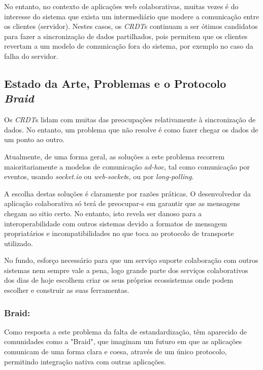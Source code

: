 \documentclass[runningheads]{llncs}
\begin{document}
        No entanto, no contexto de aplicações web colaborativas, muitas vezes é do 
        interesse do sistema que exista um intermediário que modere a comunicação entre 
        os clientes (servidor). Nestes casos, os {\itshape CRDT}s continuam a ser ótimos 
        candidatos para fazer a sincronização de dados partilhados, pois permitem que os 
        clientes revertam a um modelo de comunicação fora do sistema, por exemplo no caso 
        da falha do servidor.

        \subsection{Estado da Arte, Problemas e o Protocolo {\itshape Braid}}

        Os {\itshape CRDT}s lidam com muitas das preocupações relativamente à sincronização 
        de dados. No entanto, um problema que não resolve é como fazer chegar os dados de um 
        ponto ao outro.

        Atualmente, de uma forma geral, as soluções a este problema recorrem maioritariamente 
        a modelos de comunicação {\itshape ad-hoc}, tal como comunicação por eventos, usando 
        {\itshape socket.io} ou {\itshape web-socket}s, ou por {\itshape long-polling}. 

        A escolha destas soluções é claramente por razões práticas. O desenvolvedor da 
        aplicação colaborativa só terá de preocupar-s em garantir que as mensagens 
        chegam ao sitio certo. No entanto, isto revela ser danoso para a interoperabilidade 
        com outros sistemas devido a formatos de mensagem propriatários e incompatibilidades
        no que toca ao protocolo de transporte utilizado. 
        
        No fundo, esforço necessário para que um serviço suporte colaboração com outros 
        sistemas nem sempre vale a pena, logo grande parte dos serviços colaborativos 
        dos dias de hoje escolhem criar os seus próprios ecossistemas onde podem escolher
        e construir as suas ferramentas.


            \subsubsection{Braid:} Como resposta a este problema da falta de estandardização, 
            têm aparecido de comunidades como a "Braid", que imaginam um futuro em que as aplicações 
            comunicam de uma forma clara e coesa, através de um único protocolo, permitindo integração 
            nativa com outras aplicações.
\end{document}
